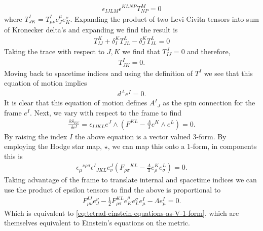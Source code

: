 \documentclass[10pt]{report}
\theoremstyle{definition}
\begin{document}
\begin{align}
     \epsilon_{I J L M} \epsilon^{K L N P} T^M_{N P} = 0
\end{align}
where $T^I_{JK} = T^I_{\mu\nu} e^\mu_J e^\nu_K$. Expanding the product of two Levi-Civita tensors into sum of Kronecker delta's and expanding we find the result is 
\begin{align}
    T^K_{IJ} + \delta_I^K T^L_{JL} - \delta_J^K T^L_{IL} = 0
\end{align}
Taking the trace with respect to $J,K$ we find that $T^J_{IJ} = 0$ and therefore,
\begin{align}
    T^I_{JK} = 0.
\end{align}
Moving back to spacetime indices and using the definition of $T^I$ we see that this equation of motion implies 
\begin{align}
    d^A e^I = 0.
\end{align}
It is clear that this equation of motion defines $A^I{}_J$ as the spin connection for the frame $e^I$. Next, we vary with respect to the frame to find 
\begin{align}
    \frac{\delta S_{EC}}{\delta e^I} = \epsilon_{IJKL} e^J \wedge \left( F^{KL} - \frac{\Lambda}{3} e^K \wedge e^L \right) = 0.
\end{align}
By raising the index $I$ the above equation is a vector valued 3-form. By employing the Hodge star map, $\star$, we can map this onto a 1-form, in components this is 
\begin{align}
    \epsilon_{\mu}{}^{\nu\rho\sigma} \epsilon^I{}_{JKL} e^J_\nu \left( F_{\rho\sigma}{}^{KL} - \frac{\Lambda}{3} e^K_\rho e^L_\sigma \right) = 0.
\end{align}
Taking advantage of the frame to translate internal and spacetime indices we can use the  product of epsilon tensors to find the above is proportional to
\begin{align}
    F^{IJ}_{\mu\nu} e^\nu_J - \frac{1}{2} F^{KL}_{\rho\sigma} e^\rho_K e^\sigma_L e^I_\mu - \Lambda e^I_\mu = 0.
\end{align}
Which is equivalent to \cref{eq:tetrad-einstein-equations-as-V-1-form}, which are themselves equivalent to Einstein's equations on the metric.
\end{document}
